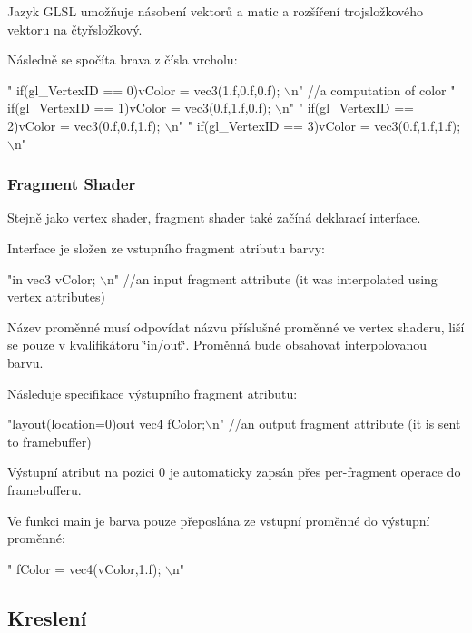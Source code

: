 Jazyk G\-L\-S\-L umožňuje násobení vektorů a matic a rozšíření trojsložkového vektoru na čtyřsložkový.\par
 Následně se spočíta brava z čísla vrcholu\-: 
\begin{DoxyCodeInclude}
\textcolor{stringliteral}{"  if(gl\_VertexID == 0)vColor = vec3(1.f,0.f,0.f);              \(\backslash\)n"} \textcolor{comment}{//a computation of color}
\textcolor{stringliteral}{"  if(gl\_VertexID == 1)vColor = vec3(0.f,1.f,0.f);              \(\backslash\)n"}
\textcolor{stringliteral}{"  if(gl\_VertexID == 2)vColor = vec3(0.f,0.f,1.f);              \(\backslash\)n"}
\textcolor{stringliteral}{"  if(gl\_VertexID == 3)vColor = vec3(0.f,1.f,1.f);              \(\backslash\)n"}
\end{DoxyCodeInclude}
\hypertarget{quadExample.c_FragmentShader}{}\subsubsection{Fragment Shader}\label{quadExample.c_FragmentShader}
Stejně jako vertex shader, fragment shader také začíná deklarací interface.\par
 Interface je složen ze vstupního fragment atributu barvy\-: 
\begin{DoxyCodeInclude}
\textcolor{stringliteral}{"in vec3 vColor;                   \(\backslash\)n"} \textcolor{comment}{//an input fragment attribute (it was interpolated using vertex
       attributes)}
\end{DoxyCodeInclude}
Název proměnné musí odpovídat názvu příslušné proměnné ve vertex shaderu, liší se pouze v kvalifikátoru \char`\"{}in/out\char`\"{}. Proměnná bude obsahovat interpolovanou barvu.\par
 Následuje specifikace výstupního fragment atributu\-: 
\begin{DoxyCodeInclude}
\textcolor{stringliteral}{"layout(location=0)out vec4 fColor;\(\backslash\)n"} \textcolor{comment}{//an output fragment attribute (it is sent to framebuffer)}
\end{DoxyCodeInclude}
Výstupní atribut na pozici 0 je automaticky zapsán přes per-\/fragment operace do framebufferu.\par
 Ve funkci main je barva pouze přeposlána ze vstupní proměnné do výstupní proměnné\-: 
\begin{DoxyCodeInclude}
\textcolor{stringliteral}{"  fColor = vec4(vColor,1.f);      \(\backslash\)n"}
\end{DoxyCodeInclude}
\hypertarget{quadExample.c_Draw}{}\subsection{Kreslení}\label{quadExample.c_Draw}
